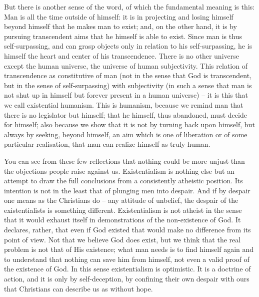 \documentclass[12pt]{article}
\begin{document}
But there is another sense of the word, of which the fundamental meaning is this: Man is all the time outside of himself: it is in projecting and losing himself beyond himself that he makes man to exist; and, on the other hand, it is by pursuing transcendent aims that he himself is able to exist. Since man is thus self-surpassing, and can grasp objects only in relation to his self-surpassing, he is himself the heart and center of his transcendence. There is no other universe except the human universe, the universe of human subjectivity. This relation of transcendence as constitutive of man (not in the sense that God is transcendent, but in the sense of self-surpassing) with subjectivity (in such a sense that man is not shut up in himself but forever present in a human universe) – it is this that we call existential humanism. This is humanism, because we remind man that there is no legislator but himself; that he himself, thus abandoned, must decide for himself; also because we show that it is not by turning back upon himself, but always by seeking, beyond himself, an aim which is one of liberation or of some particular realisation, that man can realize himself as truly human.

You can see from these few reflections that nothing could be more unjust than the objections people raise against us. Existentialism is nothing else but an attempt to draw the full conclusions from a consistently atheistic position. Its intention is not in the least that of plunging men into despair. And if by despair one means as the Christians do – any attitude of unbelief, the despair of the existentialists is something different. Existentialism is not atheist in the sense that it would exhaust itself in demonstrations of the non-existence of God. It declares, rather, that even if God existed that would make no difference from its point of view. Not that we believe God does exist, but we think that the real problem is not that of His existence; what man needs is to find himself again and to understand that nothing can save him from himself, not even a valid proof of the existence of God. In this sense existentialism is optimistic. It is a doctrine of action, and it is only by self-deception, by confining their own despair with ours that Christians can describe us as without hope.
\end{document}
